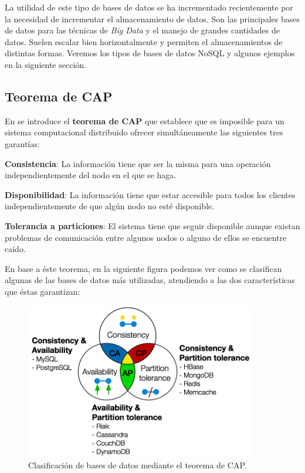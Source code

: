 La utilidad de este tipo de bases de datos se ha incrementado recientemente por la necesidad de incrementar el almacenamiento de datos. Son las principales bases de datos para las técnicas de \textit{Big Data} y el manejo de grandes cantidades de datos. Suelen escalar bien horizontalmente y permiten el almacenamientos de distintas formas. Veremos los tipos de bases de datos NoSQL y algunos ejemplos en la siguiente sección.

\subsection{Teorema de CAP}
En \cite{captheorem} se introduce el \textbf{teorema de CAP} que establece que es imposible para un sistema computacional distribuido ofrecer simultáneamente las siguientes tres garantías:

\textbf{Consistencia}: La información tiene que ser la misma para una operación independientemente del nodo en el que se haga.

\textbf{Disponibilidad}: La información tiene que estar accesible para todos los clientes independientemente de que algún nodo no esté disponible.

\textbf{Tolerancia a particiones}: El sistema tiene que seguir disponible aunque existan problemas de comunicación entre algunos nodos o alguno de ellos se encuentre caído.

En base a éste teorema, en la siguiente figura podemos ver como se clasifican algunas de las bases de datos más utilizadas, atendiendo a las dos características que éstas garantizan:

\begin{figure}[h]
  \centering
  \includegraphics[width=0.9\textwidth]{gfx/CAPTheorem.png}
  \caption{Clasificación de bases de datos mediante el teorema de CAP.}
\end{figure}


